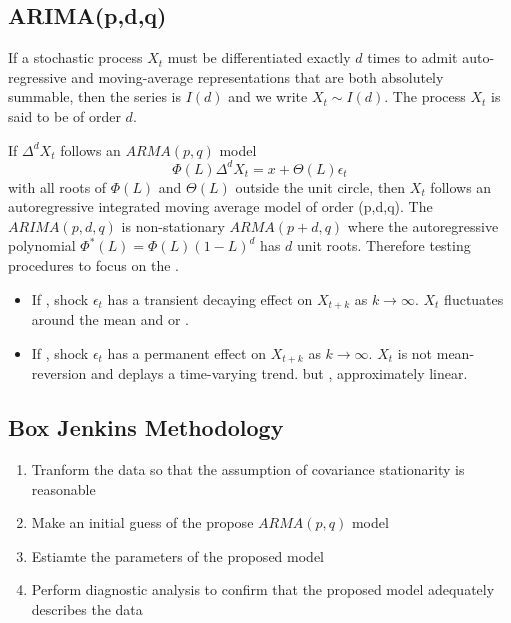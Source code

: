 \subsection{ARIMA(p,d,q)}

\begin{definition}
    If a stochastic process $X_t$ must be differentiated exactly $d$ times to admit auto-regressive and moving-average representations that are both absolutely summable,
    then the series is $I(d)$ and we write $X_t\sim I(d)$. The process $X_t$ is said to be  of order $d$.
\end{definition}

If $\Delta^dX_t$ follows an $ARMA(p,q)$ model 
\begin{equation*}
    \Phi(L)\Delta^d X_t = x + \Theta(L)\epsilon_t
\end{equation*}
with all roots of $\Phi(L)$ and $\Theta(L)$ outside the unit circle, then $X_t$ follows an autoregressive integrated moving average model of order (p,d,q).
The $ARIMA(p,d,q)$ is non-stationary $ARMA(p+d, q)$ where the autoregressive polynomial $\Phi^*(L) = \Phi(L)(1-L)^d$ has $d$ unit roots.
Therefore testing procedures to  focus on the .
\begin{itemize}
    \item If , shock $\epsilon_t$ has a transient decaying effect on $X_{t+k}$ as $k\to\infty$. 
    $X_t$ fluctuates around the mean and  or .
    \item If , shock $\epsilon_t$ has a permanent effect on $X_{t+k}$ as $k\to\infty$. 
    $X_t$ is not mean-reversion and deplays a time-varying trend.
     but , approximately linear.
\end{itemize}

\subsection{Box Jenkins Methodology}

\begin{enumerate}
    \item Tranform the data so that the assumption of covariance stationarity is reasonable 
    \item Make an initial guess of the propose $ARMA(p,q)$ model 
    \item Estiamte the parameters of the proposed model 
    \item Perform diagnostic analysis to confirm that the proposed model adequately describes the data
\end{enumerate}

